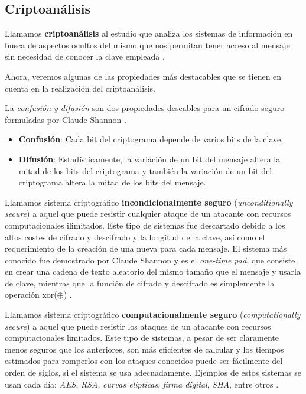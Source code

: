 \subsection{Criptoanálisis}
\begin{dfn}
	Llamamos \textbf{criptoanálisis} al estudio que analiza los sistemas de información en busca de aspectos ocultos del mismo que nos permitan tener acceso al mensaje sin necesidad de conocer la clave empleada \cite{Crypto_Bases2}.
\end{dfn}

Ahora, veremos algunas de las propiedades más destacables que se tienen en cuenta en la realización del criptoanálisis.
\begin{dfn}
	La \textit{confusión y difusión} son dos propiedades deseables para un cifrado seguro formuladas por Claude Shannon
	\cite{Shannon}.
	\begin{itemize}
		\item \textbf{Confusión}: Cada bit del criptograma depende de varios bits de la clave.
		\item \textbf{Difusión}: Estadísticamente, la variación de un bit del mensaje altera la mitad de los bits del criptograma y también la variación de un bit del criptograma altera la mitad de los bits del mensaje.
	\end{itemize}
\end{dfn}

\begin{dfn}
	Llamamos sistema criptográfico \textbf{incondicionalmente seguro} (\textit{unconditionally secure}) a aquel que puede resistir cualquier ataque de un atacante con recursos computacionales ilimitados. Este tipo de sistemas fue descartado debido a los altos costes de cifrado y descifrado y la longitud de la clave, así como el requerimiento de la creación de una nueva para cada mensaje. El sistema más conocido fue demostrado por Claude Shannon y es el \textit{one-time pad}, que consiste en crear una cadena de texto aleatorio del mismo tamaño que el mensaje y usarla de clave, mientras que la función de cifrado y descifrado es simplemente la operación xor($\oplus$) \cite{Crypto_Bases}.
\end{dfn}

\begin{dfn}
	Llamamos sistema criptográfico \textbf{computacionalmente seguro} (\textit{computationally secure}) a aquel que puede resistir los ataques de un atacante con recursos computacionales limitados. Este tipo de sistemas, a pesar de ser claramente menos seguros que los anteriores, son más eficientes de calcular y los tiempos estimados para romperlos con los ataques conocidos puede ser fácilmente del orden de siglos, si el sistema se usa adecuadamente. Ejemplos de estos sistemas se usan cada día: \textit{AES}, \textit{RSA}, \textit{curvas elípticas}, \textit{firma digital}, \textit{SHA}, entre otros \cite{Crypto_Bases}.
\end{dfn}


